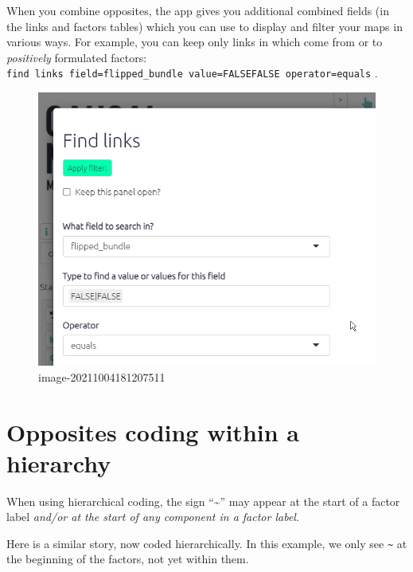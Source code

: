 \documentclass[
]{book}
\begin{document}
When you combine opposites, the app gives you additional combined fields (in the links and factors tables) which you can use to display and filter your maps in various ways. For example, you can keep only links in which come from or to \emph{positively} formulated factors: \texttt{find\ links\ field=flipped\_bundle\ value=FALSE\textbar{}FALSE\ operator=equals} .

\begin{figure}
\centering
\includegraphics[width=6.77083in,height=\textheight]{_assets/image-20211004181207511.png}
\caption{image-20211004181207511}
\end{figure}

\hypertarget{opposites-coding-within-a-hierarchy}{%
\section{Opposites coding within a hierarchy}\label{opposites-coding-within-a-hierarchy}}

When using hierarchical coding, the sign ``\textasciitilde{}'' may appear at the start of a factor label \emph{and/or at the start of any component in a factor label}.

Here is a similar story, now coded hierarchically. In this example, we only see \texttt{\textasciitilde{}} at the beginning of the factors, not yet within them.
\end{document}
